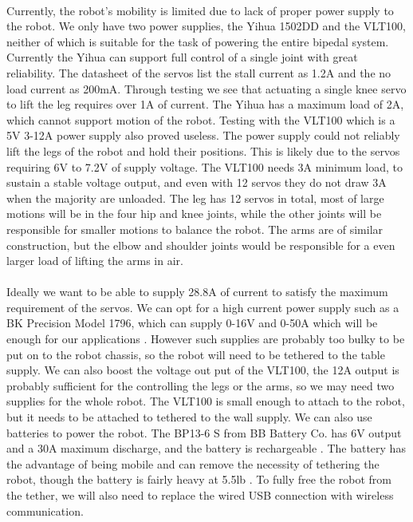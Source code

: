\documentclass[titlepage,letterpaper,12pt]{article}
\begin{document}
\paragraph{}Currently, the robot's mobility is limited due to lack of
proper power supply to the robot. We only have two power supplies, the
Yihua 1502DD and the VLT100, neither of which is suitable for the task of
powering the entire bipedal system. Currently the Yihua can support full control
of a single joint with great reliability. The datasheet of the servos list the
stall current as 1.2A and the no load current as 200mA. Through testing we see
that actuating a single knee servo to lift the leg requires over 1A of current.
The Yihua has a maximum load of 2A, which cannot support motion of the robot.
Testing with the VLT100 which is a 5V 3-12A power supply also proved useless.
The power supply could not reliably lift the legs of the robot and hold their
positions. This is likely due to the servos requiring 6V to 7.2V of supply
voltage. The VLT100 needs 3A minimum load, to sustain a stable voltage output,
and even with 12 servos they do not draw 3A when the majority are unloaded. The
leg has 12 servos in total, most of large motions will be in the four hip and
knee joints, while the other joints will be responsible for smaller motions to
balance the robot.  The arms are of similar construction, but the elbow and
shoulder joints would be responsible for a even larger load of lifting the arms
in air. 

\paragraph{}Ideally we want to be able to supply 28.8A of current to
satisfy the maximum requirement of the servos. We can opt for a high current
power supply such as a BK Precision Model 1796, which can supply 0-16V and 0-50A
which will be enough for our applications \cite{bkpowerdata}. However such
supplies are probably too bulky to be put on to the robot chassis, so the robot
will need to be tethered to the table supply. We can also boost the voltage out
put of the VLT100, the 12A output is probably sufficient for the controlling the
legs or the arms, so we may need two supplies for the whole robot. The VLT100 is
small enough to attach to the robot, but it needs to be attached to tethered to
the wall supply. We can also use batteries to power the robot. The BP13-6 S from
BB Battery Co. has 6V output and a 30A maximum discharge, and the battery is
rechargeable \cite{batterydata}. The battery has the advantage of being mobile
and can remove the necessity of tethering the robot, though the battery is
fairly heavy at 5.5lb \cite{batterydata}. To fully free the robot from the
tether, we will also need to replace the wired USB connection with wireless
communication.
\end{document}
